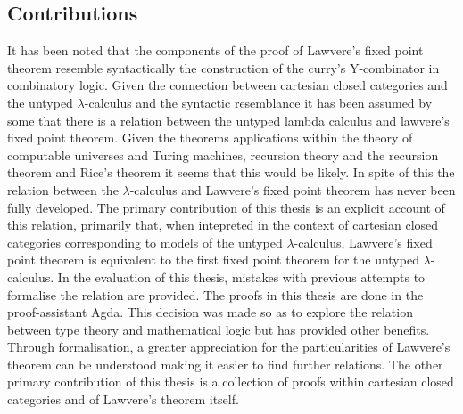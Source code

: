 \subsection{Contributions}
It has been noted that the components of the proof of Lawvere's fixed point
theorem resemble syntactically the construction of the curry's Y-combinator in
combinatory logic. Given the connection between cartesian closed categories and
the untyped $\lambda$-calculus and the syntactic resemblance it has been assumed by
some that there is a relation between the untyped lambda calculus and lawvere's
fixed point theorem. Given the theorems applications within the theory of
computable universes and Turing machines, recursion theory and the recursion
theorem and Rice's theorem it seems that this would be likely. In spite of this
the relation between the $\lambda$-calculus and Lawvere's fixed point theorem has
never been fully developed. The primary contribution of this thesis is an
explicit account of this relation, primarily that, when intepreted in the
context of cartesian closed categories corresponding to models of the untyped
$\lambda$-calculus, Lawvere's fixed point theorem is equivalent to the first
fixed point theorem for the untyped $\lambda$-calculus. In the evaluation of
this thesis, mistakes with previous attempts to formalise the relation are
provided. The proofs in this thesis are done in the proof-assistant Agda. This
decision was made so as to explore the relation between type theory and
mathematical logic but has provided other benefits. Through formalisation, a
greater appreciation for the particularities of Lawvere's theorem can be
understood making it easier to find further relations. The other primary
contribution of this thesis is a collection of proofs within cartesian closed
categories and of Lawvere's theorem itself.

